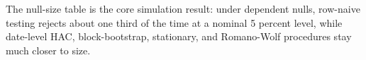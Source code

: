 The null-size table is the core simulation result: under dependent nulls,
row-naive testing rejects about one third of the time at a nominal
5 percent level, while date-level HAC, block-bootstrap, stationary, and
Romano-Wolf procedures stay much closer to size.

\begin{table}[t]
\centering
\small
\caption{Null rejection rates at nominal 5 percent size.}
\label{tab:size}
\end{table}
